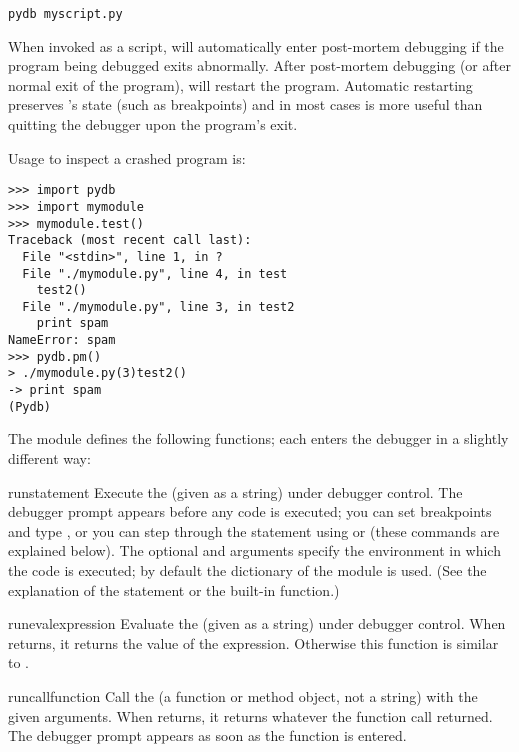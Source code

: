 \begin{verbatim}
pydb myscript.py
\end{verbatim}

When invoked as a script,  will automatically enter
post-mortem debugging if the program being debugged exits
abnormally. After post-mortem debugging (or after normal exit of the
program),  will restart the program.  Automatic restarting
preserves 's state (such as breakpoints) and in most cases is more
useful than quitting the debugger upon the program's exit.

Usage to inspect a crashed program is:

\begin{verbatim}
>>> import pydb
>>> import mymodule
>>> mymodule.test()
Traceback (most recent call last):
  File "<stdin>", line 1, in ?
  File "./mymodule.py", line 4, in test
    test2()
  File "./mymodule.py", line 3, in test2
    print spam
NameError: spam
>>> pydb.pm()
> ./mymodule.py(3)test2()
-> print spam
(Pydb) 
\end{verbatim}

The module defines the following functions; each enters the debugger
in a slightly different way:

\begin{funcdesc}{run}{statement}
Execute the  (given as a string) under debugger
control.  The debugger prompt appears before any code is executed; you
can set breakpoints and type , or you can step through
the statement using  or  (these commands are
explained below).  The optional  and 
arguments specify the environment in which the code is executed; by
default the dictionary of the module  is
used.  (See the explanation of the  statement or the
 built-in function.)
\end{funcdesc}

\begin{funcdesc}{runeval}{expression}
Evaluate the  (given as a string) under debugger
control.  When  returns, it returns the value of the
expression.  Otherwise this function is similar to
.
\end{funcdesc}

\begin{funcdesc}{runcall}{function}
Call the  (a function or method object, not a string)
with the given arguments.  When  returns, it returns
whatever the function call returned.  The debugger prompt appears as
soon as the function is entered.
\end{funcdesc}


